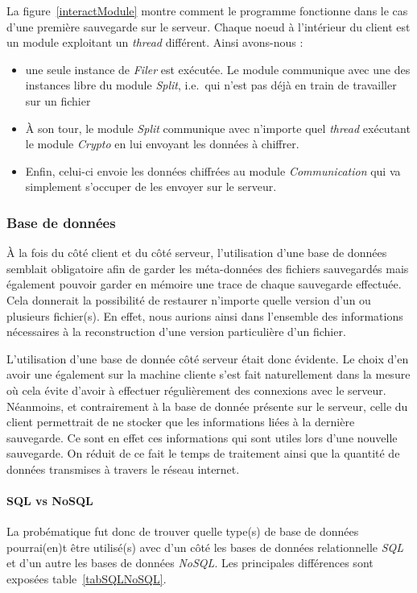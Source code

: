 \documentclass[a4paper,10pt, twoside]{report}
\begin{document}
\begin{spacing}{1.2}
La figure~\ref{interactModule} montre comment le programme fonctionne dans le
cas d'une premi\`ere sauvegarde sur le serveur. Chaque noeud \`a l'int\'erieur
du client est un module exploitant un \textit{thread} diff\'erent. Ainsi
avons-nous :
\begin{itemize}
 \item une seule instance de \textit{Filer} est ex\'ecut\'ee. Le module
 communique avec une des instances libre du module \textit{Split}, i.e.~qui
 n'est pas d\'ej\`a en train de travailler sur un fichier
 \item \`A son tour, le module \textit{Split} communique avec n'importe quel
 \textit{thread} ex\'ecutant le module \textit{Crypto} en lui envoyant les
 donn\'ees \`a chiffrer.
 \item Enfin, celui-ci envoie les donn\'ees chiffr\'ees au module
 \textit{Communication} qui va simplement s'occuper de les envoyer sur le
 serveur.
\end{itemize}

\subsubsection{Base de donn\'ees}
\`A la fois du c\^ot\'e client et du c\^ot\'e serveur, l'utilisation d'une
base de donn\'ees semblait obligatoire afin de garder les m\'eta-donn\'ees
des fichiers sauvegard\'es mais \'egalement pouvoir garder en m\'emoire une
trace de chaque sauvegarde effectu\'ee. Cela donnerait la possibilit\'e
de restaurer n'importe quelle version d'un ou plusieurs fichier(s). En effet,
nous aurions ainsi dans l'ensemble des informations n\'ecessaires \`a la
reconstruction d'une version particuli\`ere d'un fichier.

L'utilisation d'une base de donn\'ee c\^ot\'e serveur \'etait donc \'evidente.
Le choix d'en avoir une \'egalement sur la machine cliente s'est fait
naturellement dans la mesure o\`u cela \'evite d'avoir \`a effectuer
r\'eguli\`erement des connexions avec le serveur. N\'eanmoins, et contrairement
\`a la base de donn\'ee pr\'esente sur le serveur, celle du client permettrait
de ne stocker que les informations li\'ees \`a la derni\`ere sauvegarde. Ce
sont en effet ces informations qui sont utiles lors d'une nouvelle sauvegarde.
On r\'eduit de ce fait le temps de traitement ainsi que la quantit\'e de
donn\'ees transmises \`a travers le r\'eseau internet.

\paragraph{SQL vs NoSQL}
La prob\'ematique fut donc de trouver quelle type(s) de base de donn\'ees
pourrai(en)t \^etre utilis\'e(s) avec d'un c\^ot\'e les bases de donn\'ees
relationnelle \textit{SQL} et d'un autre les bases de donn\'ees \textit{NoSQL}.
Les principales diff\'erences sont expos\'ees table~\ref{tabSQLNoSQL}.


\end{spacing}
\end{document}
